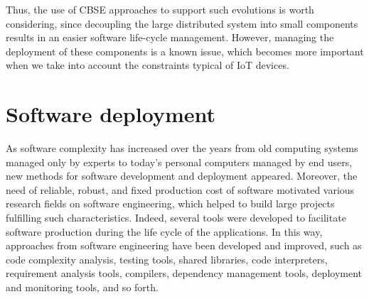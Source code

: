 Thus, the use of CBSE approaches to support such evolutions is worth considering, since decoupling the large distributed system into small components results in an easier software life-cycle management.
However, managing the deployment of these components is a known issue, which becomes more important when we take into account the constraints typical of IoT devices.

\section{Software deployment}
\label{sec:softDeployment}
As software complexity has increased over the years from old computing systems managed only by experts to today's personal computers managed by end users, new methods for software development and deployment appeared.
Moreover, the need of reliable, robust, and fixed production cost of software motivated various research fields on software engineering, which helped to build large projects fulfilling such characteristics.
Indeed, several tools were developed to facilitate software production during the life cycle of the applications.
In this way, approaches from software engineering have been developed and improved, such as code complexity analysis, testing tools, shared libraries, code interpreters, requirement analysis tools, compilers, dependency management tools, deployment and monitoring tools, and so forth.

